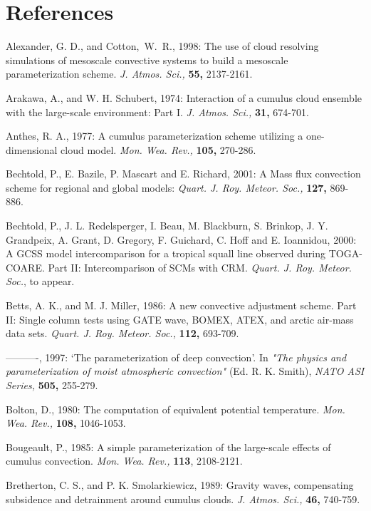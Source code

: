 \section{References}

\noindent
\por
Alexander, G. D., and Cotton,~W.~R., 1998:
The use of cloud resolving simulations of mesoscale convective
systems to build a mesoscale parameterization scheme.
{\it J. Atmos. Sci.,} {\bf 55,} 2137-2161.

\por
Arakawa, A., and W. H. Schubert, 1974: Interaction of a cumulus
cloud ensemble with the large-scale environment: Part I.
{\it J. Atmos. Sci.,} {\bf 31,} 674-701.

\por
Anthes, R. A., 1977: A cumulus parameterization scheme utilizing
a one-dimensional cloud model. {\it Mon. Wea. Rev.,} {\bf 105,} 270-286.

\por
Bechtold, P.,  E. Bazile, P. Mascart and E. Richard, 2001:
A Mass flux convection scheme for regional and global models:
{\it Quart. J. Roy. Meteor. Soc.,} {\bf 127,} 869-886.

\por
Bechtold, P., J. L. Redelsperger, I. Beau, M. Blackburn, S. Brinkop,
J. Y. Grandpeix, A. Grant, D. Gregory, F. Guichard, C. Hoff
and E. Ioannidou, 2000: A GCSS model
intercomparison for a tropical squall line observed during TOGA-COARE.
Part II: Intercomparison of SCMs with CRM.
{\it Quart. J. Roy. Meteor. Soc.}, to appear.

\por
Betts, A. K., and M. J. Miller, 1986: A new convective adjustment scheme.
Part II: Single column tests using GATE wave, BOMEX, ATEX, and arctic air-mass
data sets. {\it Quart. J. Roy. Meteor. Soc.,} {\bf 112,} 693-709.

\por
----------, 1997:
`The parameterization of deep convection'.
In {\it "The physics and parameterization of moist atmospheric convection"}
(Ed. R. K. Smith), {\it NATO ASI Series,} {\bf 505,} 255-279.

\por
Bolton, D., 1980: The computation of equivalent potential temperature.
{\it Mon. Wea. Rev.,} {\bf 108,} 1046-1053.

\por
Bougeault, P., 1985: A simple parameterization of the large-scale
effects of cumulus convection. {\it Mon. Wea. Rev.,} {\bf 113}, 2108-2121.

\por
Bretherton, C. S., and P. K. Smolarkiewicz, 1989: Gravity waves,
compensating subsidence and detrainment around cumulus clouds.
{\it J. Atmos. Sci.,} {\bf 46,} 740-759.

